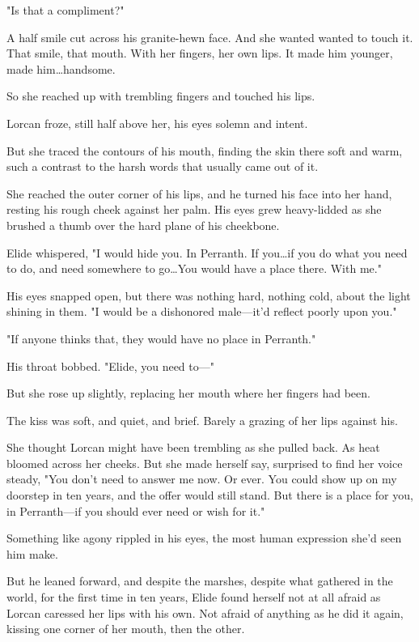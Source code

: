 "Is that a compliment?"

A half smile cut across his granite-hewn face.
And she wanted 
wanted to touch it.
That smile, that mouth.
With her fingers, her own lips.
It made him younger, made him\ldots handsome.

So she reached up with trembling fingers and touched his lips.

Lorcan froze, still half above her, his eyes solemn and intent.

But she traced the contours of his mouth, finding the skin there soft and warm, such a contrast to the harsh words that usually came out of it.

She reached the outer corner of his lips, and he turned his face into her hand, resting his rough cheek against her palm.
His eyes grew heavy-lidded as she brushed a thumb over the hard plane of his cheekbone.

Elide whispered, "I would hide you.
In Perranth.
If you\ldots if you do what you need to do, and need somewhere to go\ldots You would have a place there.
With me."

His eyes snapped open, but there was nothing hard, nothing cold, about the light shining in them.
"I would be a dishonored male---it'd reflect poorly upon you."

"If anyone thinks that, they would have no place in Perranth."

His throat bobbed.
"Elide, you need to---"

But she rose up slightly, replacing her mouth where her fingers had been.

The kiss was soft, and quiet, and brief.
Barely a grazing of her lips against his.

She thought Lorcan might have been trembling as she pulled back.
As heat bloomed across her cheeks.
But she made herself say, surprised to find her voice steady, "You don't need to answer me now.
Or ever.
You could show up on my doorstep in ten years, and the offer would still stand.
But there is a place for you, in Perranth---if you should ever need or wish for it."

Something like agony rippled in his eyes, the most human expression she'd seen him make.

But he leaned forward, and despite the marshes, despite what gathered in the world, for the first time in ten years, Elide found herself not at all afraid as Lorcan caressed her lips with his own.
Not afraid of anything as he did it again, kissing one corner of her mouth, then the other.

